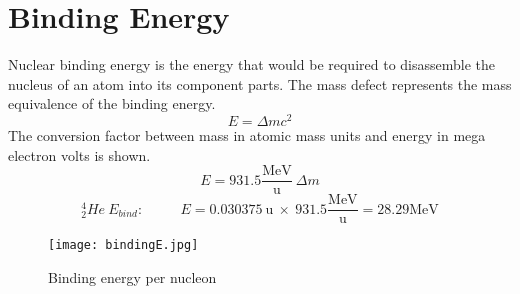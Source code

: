 \section{Binding Energy}
Nuclear binding energy is the energy that would be required to disassemble the nucleus of an atom into its component parts.  The mass defect represents the mass equivalence of the binding energy.  
$$E=\Delta m c^2$$
The conversion factor between mass in atomic mass units and energy in mega electron volts is shown.
$$E=931.5\frac{\text{MeV}}{\text{u}}\ \Delta m$$
$${}_{2}^{4}He\ E_{bind}:\ \hspace{1cm}E=0.030375\ \text{u} \ \times \ 931.5\frac{\text{MeV}}{\text{u}}=28.29\text{MeV}$$
\newpage
\begin{figure}%
  \texttt{[image: bindingE.jpg]}
  \caption{Binding energy per nucleon}
  \label{fig:marginfig}
\end{figure}
